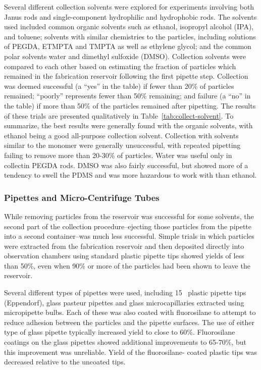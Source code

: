 Several different collection solvents were explored for experiments involving both Janus rods and single-component
hydrophilic and hydrophobic rods.  The solvents used included 
common organic solvents such as ethanol,
isopropyl alcohol (IPA), and toluene; solvents with similar chemistries to the particles, including solutions of 
PEGDA, ETMPTA and TMPTA as well as ethylene glycol; and the common polar solvents water and dimethyl sulfoxide (DMSO).
Collection solvents were compared to each other based on estimating the fraction of particles which remained in the
fabrication reservoir following the first pipette step.  Collection was deemed successful (a 
``yes'' in the table) if fewer than 20\% of particles remained; ``poorly'' represents fewer than 50\% remaining; and 
failure (a ``no'' in the table) if more than 50\% of the particles remained after pipetting.
The results of these trials are presented qualitatively in Table~\ref{tab:collect-solvent}.  To summarize, the best
results were generally found with the organic solvents, with ethanol being a good all-purpose collection solvent.
Collection with solvents similar to the monomer were generally unsuccessful, with repeated pipetting failing to 
remove more than 20-30\% of particles.  Water was useful only in collectin PEGDA rods.
DMSO was also fairly successful, but showed more of a tendency to swell the PDMS
and was more hazardous to work with than ethanol.

\subsubsection{Pipettes and Micro-Centrifuge Tubes}

While removing particles from the reservoir was successful for some solvents, the second part of the collection 
procedure--ejecting those particles from the pipette into a second container--was much less successful.  
Simple trials in which particles were extracted from the fabrication reservoir and then deposited directly into 
observation chambers using standard plastic pipette tips showed yields of less than 50\%, 
even when 90\% or more of the particles had been shown to leave the reservoir.  


Several different types of pipettes were used, including 15 \uL~plastic pipette tips (Eppendorf), glass pasteur pipettes and
glass microcapillaries extracted using micropipette bulbs.  Each of these 
was also coated with fluorosilane to attempt to reduce adhesion between the particles and the pipette surfaces.
The use of either type of glass pipette typically increased yield to close to 60\%. Fluorosilane coatings on the glass
pipettes showed additional improvements to 65-70\%, but this improvement was unreliable.  Yield of the fluorosilane-
coated plastic tips was decreased relative to the uncoated tips.

